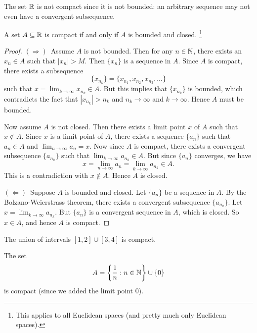 \begin{example}
  The set $\mathbb{R}$ is not compact since it is not bounded:
  an arbitrary sequence may not even have a convergent
  subsequence.
\end{example}

\begin{theorem}
  \label{thm:compactness}
  A set $A \subseteq \mathbb{R}$ is compact if and only if
  $A$ is bounded and closed.
  \footnote{This applies to all Euclidean spaces (and pretty much only Euclidean spaces).}
\end{theorem}

\begin{proof}
  $(\Rightarrow)$\, Assume $A$ is not bounded. Then for any
  $n \in \mathbb{N}$, there exists an $x_n \in A$ such that
  $|x_n| > M$. Then $\{x_n\}$ is a sequence in $A$.
  Since $A$ is compact, there exists a subsequence
  \[\{x_{n_k}\} = \{x_{n_1}, x_{n_2}, x_{n_3}, \dots\}\]
  such
  that $x = \lim_{k \to \infty} x_{n_k} \in A$. But this
  implies that $\{x_{n_k}\}$ is bounded, which contradicts
  the fact that $|x_{n_k}| > n_k$ and $n_k \to \infty$
  and $k \to \infty$. Hence $A$ must be bounded.

  Now assume $A$ is not closed. Then there exists a limit
  point $x$ of $A$ such that $x \notin A$. Since $x$ is
  a limit point of $A$, there exists a sequence
  $\{a_n\}$ such that $a_n \in A$ and
  $\lim_{n \to \infty} a_n = x$. Now since $A$ is compact,
  there exists a convergent subsequence $\{a_{n_k}\}$ such that
  $\lim_{k \to \infty} a_{n_k} \in A$. But since
  $\{a_n\}$ converges, we have
  \[x = \lim_{n \to \infty} a_n = \lim_{k \to \infty} a_{n_k} \in A.\]
  This is a contradiction with $x \notin A$. Hence $A$ is closed.

  $(\Leftarrow)$\, Suppose $A$ is bounded and closed. Let
  $\{a_n\}$ be a sequence in $A$. By the Bolzano-Weierstrass
  theorem, there exists a convergent subsequence $\{a_{n_k}\}$.
  Let $x = \lim_{k \to \infty} a_{n_k}$. But $\{a_n\}$ is
  a convergent sequence in $A$, which is closed. So $x \in A$,
  and hence $A$ is compact.
\end{proof}

\begin{example}
  The union of intervals $[1, 2] \cup [3, 4]$ is compact.
\end{example}

\begin{example}
  The set
  \[A = \left\{\frac{1}{n} : n \in \mathbb{N}\right\} \cup \{0\}\]
  is compact (since we added the limit point $0$).
\end{example}

